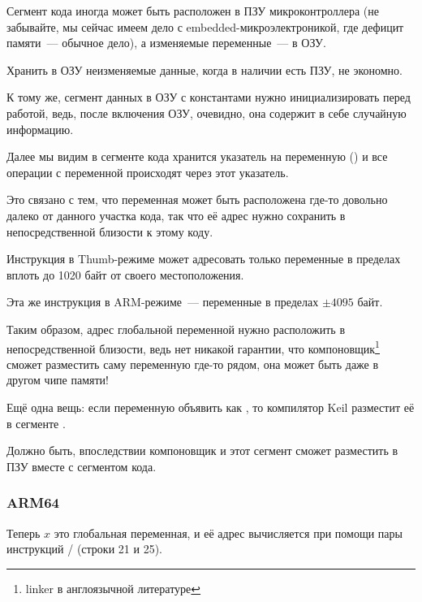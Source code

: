 \myindex{\RAM}
\myindex{\ROM}
Сегмент кода иногда может быть расположен в ПЗУ микроконтроллера (не забывайте, 
мы сейчас имеем дело с embedded-микроэлектроникой, где дефицит памяти~--- обычное дело),
а изменяемые переменные~--- в ОЗУ.

Хранить в ОЗУ неизменяемые данные, когда в наличии есть ПЗУ, не экономно.

К тому же, сегмент данных в ОЗУ с константами нужно инициализировать перед работой,
ведь, после включения ОЗУ, очевидно, она содержит в себе случайную информацию.

Далее мы видим в сегменте кода хранится указатель на переменную  () и 
все операции с переменной происходят через этот указатель.

Это связано с тем, что переменная  может быть расположена где-то довольно далеко от 
данного участка кода, так что её адрес нужно сохранить в непосредственной близости к этому коду.

Инструкция  в Thumb-режиме может адресовать только переменные в пределах вплоть до 1020 байт от своего местоположения.

Эта же инструкция в ARM-режиме~--- переменные в пределах $\pm{}4095$ байт.

Таким образом,
адрес глобальной переменной  нужно расположить в непосредственной близости, ведь нет никакой гарантии, 
что компоновщик\footnote{linker в англоязычной литературе} сможет разместить саму переменную где-то рядом, 
она может быть даже в другом чипе памяти!

\myindex{\ROM}
Ещё одна вещь: если переменную объявить как , то компилятор Keil разместит её в сегменте .

Должно быть, впоследствии компоновщик и этот сегмент сможет разместить в ПЗУ вместе с сегментом кода.

\subsubsection{ARM64}



Теперь $x$ это глобальная переменная, и её адрес вычисляется при помощи пары инструкций / (строки 21 и 25).

